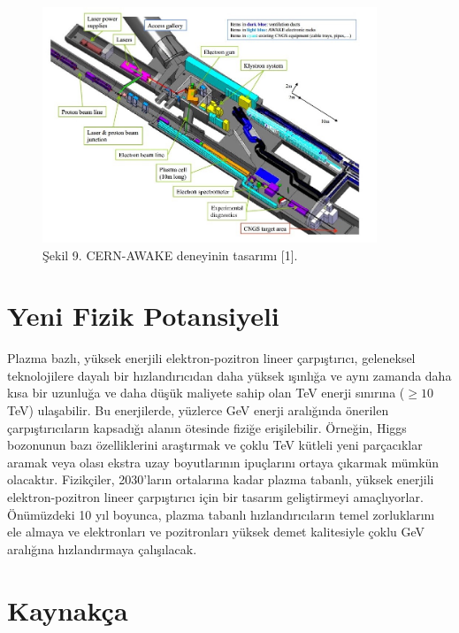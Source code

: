 \documentclass{article}
\begin{document}
	\begin{figure}[h]
 \centering
\includegraphics[width=10cm]{awake.png}
\caption*{Şekil 9. CERN-AWAKE deneyinin tasarımı [1].}
	\end{figure}
	
	
	
\clearpage

\section{Yeni Fizik Potansiyeli}	

Plazma bazlı, yüksek enerjili elektron-pozitron lineer çarpıştırıcı, geleneksel teknolojilere dayalı bir hızlandırıcıdan daha yüksek ışınlığa ve aynı zamanda daha kısa bir uzunluğa ve daha düşük maliyete sahip olan TeV enerji sınırına ($\geq 10$ TeV) ulaşabilir. Bu enerjilerde, yüzlerce GeV enerji aralığında önerilen çarpıştırıcıların kapsadığı alanın ötesinde fiziğe erişilebilir. Örneğin, Higgs bozonunun bazı özelliklerini araştırmak ve çoklu TeV kütleli yeni parçacıklar aramak veya olası ekstra uzay boyutlarının ipuçlarını ortaya çıkarmak mümkün olacaktır. Fizikçiler, 2030'ların ortalarına kadar plazma tabanlı, yüksek enerjili elektron-pozitron lineer çarpıştırıcı için bir tasarım geliştirmeyi amaçlıyorlar. Önümüzdeki 10 yıl boyunca, plazma tabanlı hızlandırıcıların temel zorluklarını ele almaya ve elektronları ve pozitronları yüksek demet kalitesiyle çoklu GeV aralığına hızlandırmaya çalışılacak.


\section{Kaynakça}
\end{document}
